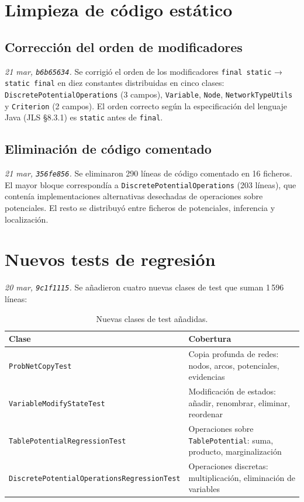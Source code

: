 \documentclass[11pt,a4paper]{article}
\begin{document}
\section{Limpieza de código estático}

\subsection{Corrección del orden de modificadores}

\emph{21 mar, \texttt{b6b65634}.}
Se corrigió el orden de los modificadores \texttt{final static} → \texttt{static final} en diez
constantes distribuidas en cinco clases: \texttt{DiscretePotentialOperations} (3 campos),
\texttt{Variable}, \texttt{Node}, \texttt{NetworkTypeUtils} y \texttt{Criterion} (2 campos).
El orden correcto según la especificación del lenguaje Java (JLS §8.3.1) es \texttt{static} antes
de \texttt{final}.

\subsection{Eliminación de código comentado}

\emph{21 mar, \texttt{356fe856}.}
Se eliminaron 290 líneas de código comentado en 16 ficheros. El mayor bloque correspondía a
\texttt{DiscretePotentialOperations} (203 líneas), que contenía implementaciones alternativas
desechadas de operaciones sobre potenciales. El resto se distribuyó entre ficheros de potenciales,
inferencia y localización.

\section{Nuevos tests de regresión}

\emph{20 mar, \texttt{9c1f1115}.}
Se añadieron cuatro nuevas clases de test que suman 1\,596 líneas:

\begin{table}[!htbp]
\centering
\begin{tabular}{ll}
\toprule
\textbf{Clase} & \textbf{Cobertura} \\
\midrule
\texttt{ProbNetCopyTest}
  & Copia profunda de redes: nodos, arcos, potenciales, evidencias \\
\texttt{VariableModifyStateTest}
  & Modificación de estados: añadir, renombrar, eliminar, reordenar \\
\texttt{TablePotentialRegressionTest}
  & Operaciones sobre \texttt{TablePotential}: suma, producto, marginalización \\
\texttt{DiscretePotentialOperationsRegressionTest}
  & Operaciones discretas: multiplicación, eliminación de variables \\
\bottomrule
\end{tabular}
\caption{Nuevas clases de test añadidas.}
\end{table}
\end{document}
